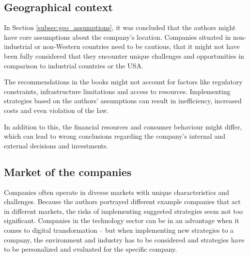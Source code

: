 \documentclass[a4]{scrartcl}
\begin{document}
\subsection{Geographical context} \label{subsec:geoconsequences}

In Section \ref{subsec:geo_assumptions}, it was concluded that the authors might have core assumptions about the company's location.
Companies situated in non-industrial or non-Western countries need to be cautious, that it might not have been fully considered that they encounter unique challenges and opportunities in comparison to industrial countries or the USA.

The recommendations in the books might not account for factors like regulatory constraints, infrastructure limitations and access to resources. Implementing strategies based on the authors' assumptions can result in inefficiency, increased costs and even violation of the law.

In addition to this, the financial resources and consumer behaviour might differ, which can lead to wrong conclusions regarding the company's internal and external decisions and investments.~\cite{consumerbehaviour}








\subsection{Market of the companies} \label{subsec:market_consequences}


Companies often operate in diverse markets with unique characteristics and challenges.
Because the authors portrayed different example companies that act in different markets, the risks of implementing suggested strategies seem not too significant. Companies in the technology sector can be in an advantage when it comes to digital transformation -- but when implementing new strategies to a company, the environment and industry has to be considered and strategies have to be personalized and evaluated for the specific company.
\end{document}
